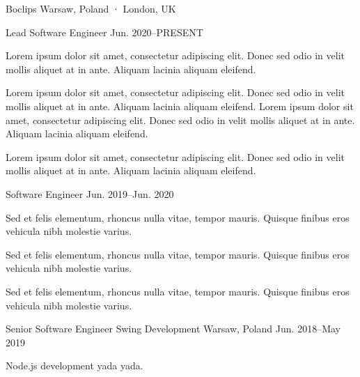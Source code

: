 
\begin{cventries}

  \multicventry
    {Boclips} %
    {Warsaw, Poland · London, UK} %
    {
      \multicventryitem
        {Lead Software Engineer} %
        {Jun. 2020–PRESENT} %
        {
          \begin{cvitems} %
            \item {Lorem ipsum dolor sit amet, consectetur adipiscing elit. Donec sed odio in velit mollis aliquet at in ante. Aliquam lacinia aliquam eleifend.}
            \item {Lorem ipsum dolor sit amet, consectetur adipiscing elit. Donec sed odio in velit mollis aliquet at in ante. Aliquam lacinia aliquam eleifend. Lorem ipsum dolor sit amet, consectetur adipiscing elit. Donec sed odio in velit mollis aliquet at in ante. Aliquam lacinia aliquam eleifend.}
            \item {Lorem ipsum dolor sit amet, consectetur adipiscing elit. Donec sed odio in velit mollis aliquet at in ante. Aliquam lacinia aliquam eleifend.}
          \end{cvitems}
        }
      \multicventryitem
        {Software Engineer} %
        {Jun. 2019–Jun. 2020} %
        {
          \begin{cvitems} %
            \item {Sed et felis elementum, rhoncus nulla vitae, tempor mauris. Quisque finibus eros vehicula nibh molestie varius.}
            \item {Sed et felis elementum, rhoncus nulla vitae, tempor mauris. Quisque finibus eros vehicula nibh molestie varius.}
            \item {Sed et felis elementum, rhoncus nulla vitae, tempor mauris. Quisque finibus eros vehicula nibh molestie varius.}
          \end{cvitems}
        }
    }

  \cventry
    {Senior Software Engineer} %
    {Swing Development} %
    {Warsaw, Poland} %
    {Jun. 2018–May 2019} %
    {
      \begin{cvitems} %
        \item {Node.js development yada yada.}
      \end{cvitems}
    }


\end{cventries}
